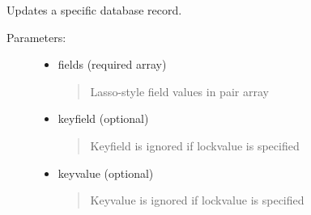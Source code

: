 \documentclass[letterpaper,10pt,english]{sphinxmanual}
\begin{document}
\begin{fulllineitems}
\begin{fulllineitems}
\label{knop_database:knop_database.resultset_count_map}
\end{fulllineitems}



\begin{fulllineitems}
\end{fulllineitems}


\begin{fulllineitems}
\label{knop_database:knop_database.saverecord}
\end{fulllineitems}


\begin{fulllineitems}
Updates a specific database record.
\begin{description}
\item[{Parameters:}] \leavevmode\begin{itemize}
\item {} 
fields (required array)
\begin{quote}

Lasso-style field values in pair array
\end{quote}

\item {} 
keyfield (optional)
\begin{quote}

Keyfield is ignored if lockvalue is specified
\end{quote}

\item {} 
keyvalue (optional)
\begin{quote}

Keyvalue is ignored if lockvalue is specified
\end{quote}


\end{itemize}
\end{description}
\end{fulllineitems}
\end{fulllineitems}
\end{document}
